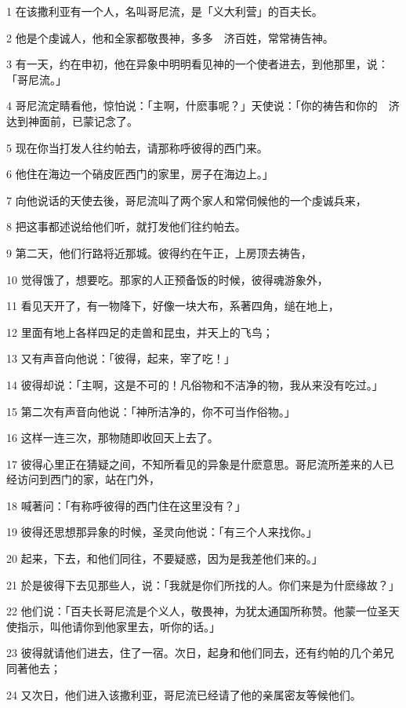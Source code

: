 \par 1 在该撒利亚有一个人，名叫哥尼流，是「义大利营」的百夫长。
\par 2 他是个虔诚人，他和全家都敬畏神，多多　济百姓，常常祷告神。
\par 3 有一天，约在申初，他在异象中明明看见神的一个使者进去，到他那里，说：「哥尼流。」
\par 4 哥尼流定睛看他，惊怕说：「主啊，什麽事呢？」天使说：「你的祷告和你的　济达到神面前，已蒙记念了。
\par 5 现在你当打发人往约帕去，请那称呼彼得的西门来。
\par 6 他住在海边一个硝皮匠西门的家里，房子在海边上。」
\par 7 向他说话的天使去後，哥尼流叫了两个家人和常伺候他的一个虔诚兵来，
\par 8 把这事都述说给他们听，就打发他们往约帕去。
\par 9 第二天，他们行路将近那城。彼得约在午正，上房顶去祷告，
\par 10 觉得饿了，想要吃。那家的人正预备饭的时候，彼得魂游象外，
\par 11 看见天开了，有一物降下，好像一块大布，系著四角，缒在地上，
\par 12 里面有地上各样四足的走兽和昆虫，并天上的飞鸟；
\par 13 又有声音向他说：「彼得，起来，宰了吃！」
\par 14 彼得却说：「主啊，这是不可的！凡俗物和不洁净的物，我从来没有吃过。」
\par 15 第二次有声音向他说：「神所洁净的，你不可当作俗物。」
\par 16 这样一连三次，那物随即收回天上去了。
\par 17 彼得心里正在猜疑之间，不知所看见的异象是什麽意思。哥尼流所差来的人已经访问到西门的家，站在门外，
\par 18 喊著问：「有称呼彼得的西门住在这里没有？」
\par 19 彼得还思想那异象的时候，圣灵向他说：「有三个人来找你。」
\par 20 起来，下去，和他们同往，不要疑惑，因为是我差他们来的。」
\par 21 於是彼得下去见那些人，说：「我就是你们所找的人。你们来是为什麽缘故？」
\par 22 他们说：「百夫长哥尼流是个义人，敬畏神，为犹太通国所称赞。他蒙一位圣天使指示，叫他请你到他家里去，听你的话。」
\par 23 彼得就请他们进去，住了一宿。次日，起身和他们同去，还有约帕的几个弟兄同著他去；
\par 24 又次日，他们进入该撒利亚，哥尼流已经请了他的亲属密友等候他们。
